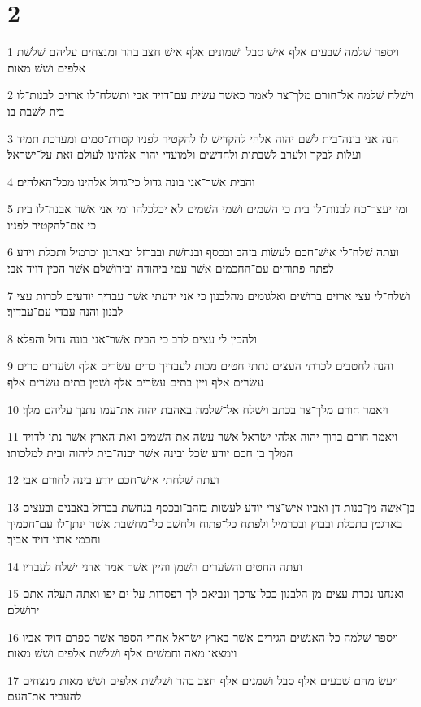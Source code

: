 \chapter{2}

\par 1 ויספר שׁלמה שׁבעים אלף אישׁ סבל ושׁמונים אלף אישׁ חצב בהר ומנצחים עליהם שׁלשׁת אלפים ושׁשׁ מאות׃
\par 2 וישׁלח שׁלמה אל־חורם מלך־צר לאמר כאשׁר עשׂית עם־דויד אבי ותשׁלח־לו ארזים לבנות־לו בית לשׁבת בו׃
\par 3 הנה אני בונה־בית לשׁם יהוה אלהי להקדישׁ לו להקטיר לפניו קטרת־סמים ומערכת תמיד ועלות לבקר ולערב לשׁבתות ולחדשׁים ולמועדי יהוה אלהינו לעולם זאת על־ישׂראל׃
\par 4 והבית אשׁר־אני בונה גדול כי־גדול אלהינו מכל־האלהים׃
\par 5 ומי יעצר־כח לבנות־לו בית כי השׁמים ושׁמי השׁמים לא יכלכלהו ומי אני אשׁר אבנה־לו בית כי אם־להקטיר לפניו׃
\par 6 ועתה שׁלח־לי אישׁ־חכם לעשׂות בזהב ובכסף ובנחשׁת ובברזל ובארגון וכרמיל ותכלת וידע לפתח פתוחים עם־החכמים אשׁר עמי ביהודה ובירושׁלם אשׁר הכין דויד אבי׃
\par 7 ושׁלח־לי עצי ארזים ברושׁים ואלגומים מהלבנון כי אני ידעתי אשׁר עבדיך יודעים לכרות עצי לבנון והנה עבדי עם־עבדיך׃
\par 8 ולהכין לי עצים לרב כי הבית אשׁר־אני בונה גדול והפלא׃
\par 9 והנה לחטבים לכרתי העצים נתתי חטים מכות לעבדיך כרים עשׂרים אלף ושׂערים כרים עשׂרים אלף ויין בתים עשׂרים אלף ושׁמן בתים עשׂרים אלף׃
\par 10 ויאמר חורם מלך־צר בכתב וישׁלח אל־שׁלמה באהבת יהוה את־עמו נתנך עליהם מלך׃
\par 11 ויאמר חורם ברוך יהוה אלהי ישׂראל אשׁר עשׂה את־השׁמים ואת־הארץ אשׁר נתן לדויד המלך בן חכם יודע שׂכל ובינה אשׁר יבנה־בית ליהוה ובית למלכותו׃
\par 12 ועתה שׁלחתי אישׁ־חכם יודע בינה לחורם אבי׃
\par 13 בן־אשׁה מן־בנות דן ואביו אישׁ־צרי יודע לעשׂות בזהב־ובכסף בנחשׁת בברזל באבנים ובעצים בארגמן בתכלת ובבוץ ובכרמיל ולפתח כל־פתוח ולחשׁב כל־מחשׁבת אשׁר ינתן־לו עם־חכמיך וחכמי אדני דויד אביך׃
\par 14 ועתה החטים והשׂערים השׁמן והיין אשׁר אמר אדני ישׁלח לעבדיו׃
\par 15 ואנחנו נכרת עצים מן־הלבנון ככל־צרכך ונביאם לך רפסדות על־ים יפו ואתה תעלה אתם ירושׁלם׃
\par 16 ויספר שׁלמה כל־האנשׁים הגירים אשׁר בארץ ישׂראל אחרי הספר אשׁר ספרם דויד אביו וימצאו מאה וחמשׁים אלף ושׁלשׁת אלפים ושׁשׁ מאות׃
\par 17 ויעשׂ מהם שׁבעים אלף סבל ושׁמנים אלף חצב בהר ושׁלשׁת אלפים ושׁשׁ מאות מנצחים להעביד את־העם׃

